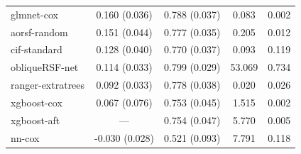 \documentclass[12pt]{article}\usepackage[]{graphicx}\usepackage[]{xcolor}
\newenvironment{knitrout}{}{} %
\begin{document}
\begin{knitrout}
\begin{longtable}[t]{lcccc}
\hspace{1em}glmnet-cox & 0.160 (0.036) & 0.788 (0.037) & 0.083 & 0.002\\
\hspace{1em}aorsf-random & 0.151 (0.044) & 0.777 (0.035) & 0.205 & 0.012\\
\hspace{1em}cif-standard & 0.128 (0.040) & 0.770 (0.037) & 0.093 & 0.119\\
\hspace{1em}obliqueRSF-net & 0.114 (0.033) & 0.799 (0.029) & 53.069 & 0.734\\
\hspace{1em}ranger-extratrees & 0.092 (0.033) & 0.778 (0.038) & 0.020 & 0.026\\
\hspace{1em}xgboost-cox & 0.067 (0.076) & 0.753 (0.045) & 1.515 & 0.002\\
\hspace{1em}xgboost-aft & --- & 0.754 (0.047) & 5.770 & 0.005\\
\hspace{1em}nn-cox & -0.030 (0.028) & 0.521 (0.093) & 7.791 & 0.118\\*
\end{longtable}

\end{knitrout}
\end{document}
